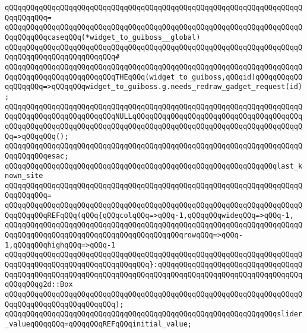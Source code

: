 \verb|qQQqqQQqqQQqqQQqqQQqqQQqqQQqqQQqqQQqqQQqqQQqqQQqqQQqqQQqqQQqqQQqqQQqqQQqqQQqqQQq=|\newline
\verb|qQQqqQQqqQQqqQQqqQQqqQQqqQQqqQQqqQQqqQQqqQQqqQQqqQQqqQQqqQQqqQQqqQQqqQQqqQQqqQQqcaseqQQq(*widget_to_guiboss__global)|\newline
\verb|qQQqqQQqqQQqqQQqqQQqqQQqqQQqqQQqqQQqqQQqqQQqqQQqqQQqqQQqqQQqqQQqqQQqqQQqqQQqqQQqqQQqqQQqqQQqqQQq#|\newline
\verb|qQQqqQQqqQQqqQQqqQQqqQQqqQQqqQQqqQQqqQQqqQQqqQQqqQQqqQQqqQQqqQQqqQQqqQQqqQQqqQQqqQQqqQQqqQQqqQQqTHEqQQq(widget_to_guiboss,qQQqid)qQQqqQQqqQQqqQQqqQQq=>qQQqqQQqwidget_to_guiboss.g.needs_redraw_gadget_request(id);|\newline
\verb|qQQqqQQqqQQqqQQqqQQqqQQqqQQqqQQqqQQqqQQqqQQqqQQqqQQqqQQqqQQqqQQqqQQqqQQqqQQqqQQqqQQqqQQqqQQqqQQqNULLqQQqqQQqqQQqqQQqqQQqqQQqqQQqqQQqqQQqqQQqqQQqqQQqqQQqqQQqqQQqqQQqqQQqqQQqqQQqqQQqqQQqqQQqqQQqqQQqqQQqqQQqqQQqqQQq=>qQQqqQQq();|\newline
\verb|qQQqqQQqqQQqqQQqqQQqqQQqqQQqqQQqqQQqqQQqqQQqqQQqqQQqqQQqqQQqqQQqqQQqqQQqqQQqqQQqesac;|\newline
\newline
\newline
\verb|qQQqqQQqqQQqqQQqqQQqqQQqqQQqqQQqqQQqqQQqqQQqqQQqqQQqqQQqqQQqqQQqlast_known_site|\newline
\verb|qQQqqQQqqQQqqQQqqQQqqQQqqQQqqQQqqQQqqQQqqQQqqQQqqQQqqQQqqQQqqQQqqQQqqQQqqQQqqQQq=|\newline
\verb|qQQqqQQqqQQqqQQqqQQqqQQqqQQqqQQqqQQqqQQqqQQqqQQqqQQqqQQqqQQqqQQqqQQqqQQqqQQqqQQqREFqQQq(qQQq{qQQqcolqQQq=>qQQq-1,qQQqqQQqwideqQQq=>qQQq-1,|\newline
\verb|qQQqqQQqqQQqqQQqqQQqqQQqqQQqqQQqqQQqqQQqqQQqqQQqqQQqqQQqqQQqqQQqqQQqqQQqqQQqqQQqqQQqqQQqqQQqqQQqqQQqqQQqqQQqqQQqrowqQQq=>qQQq-1,qQQqqQQqhighqQQq=>qQQq-1|\newline
\verb|qQQqqQQqqQQqqQQqqQQqqQQqqQQqqQQqqQQqqQQqqQQqqQQqqQQqqQQqqQQqqQQqqQQqqQQqqQQqqQQqqQQqqQQqqQQqqQQqqQQqqQQq}:qQQqqQQqqQQqqQQqqQQqqQQqqQQqqQQqqQQqqQQqqQQqqQQqqQQqqQQqqQQqqQQqqQQqqQQqqQQqqQQqqQQqqQQqqQQqqQQqqQQqqQQqqQQqqQQqg2d::Box|\newline
\verb|qQQqqQQqqQQqqQQqqQQqqQQqqQQqqQQqqQQqqQQqqQQqqQQqqQQqqQQqqQQqqQQqqQQqqQQqqQQqqQQqqQQqqQQqqQQqqQQq);|\newline
\newline
\verb|qQQqqQQqqQQqqQQqqQQqqQQqqQQqqQQqqQQqqQQqqQQqqQQqqQQqqQQqqQQqqQQqslider_valueqQQqqQQq=qQQqqQQqREFqQQqinitial_value;|\newline
\newline
